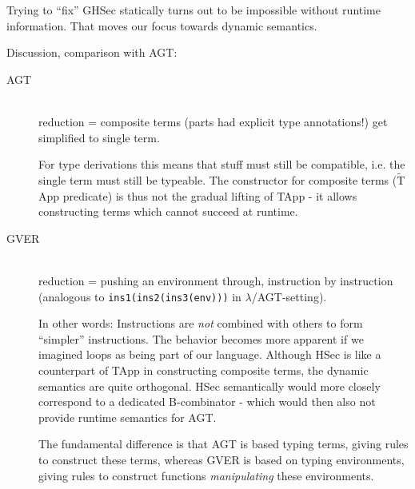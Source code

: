 \documentclass[11pt,a4paper]{article}
\newcommand{\ttt}{\texttt}
\newcommand{\grad}[1]{\widetilde{#1}}
\begin{document}
Trying to “fix” GHSec statically turns out to be impossible without runtime information. That moves our focus towards dynamic semantics. 

Discussion, comparison with AGT:
\begin{description}
	\item [AGT]~\\
	reduction = composite terms (parts had explicit type annotations!) get simplified to single term.
	
	For type derivations this means that stuff must still be compatible, i.e. the single term must still be typeable.
	The constructor for composite terms ($\grad{\text{T}}$App predicate) is thus not the gradual lifting of TApp - it allows constructing terms which cannot succeed at runtime.
	
	\item [GVER]~\\
	reduction = pushing an environment through, instruction by instruction (analogous to \ttt{ins1(ins2(ins3(env)))} in $\lambda$/AGT-setting).
	
	In other words: Instructions are \textit{not} combined with others to form “simpler” instructions.
	The behavior becomes more apparent if we imagined loops as being part of our language.
	Although HSec is like a counterpart of TApp in constructing composite terms, the dynamic semantics are quite orthogonal.
	HSec semantically would more closely correspond to a dedicated B-combinator - which would then also not provide runtime semantics for AGT.
	
	The fundamental difference is that AGT is based typing terms, giving rules to construct these terms, whereas GVER is based on typing environments, giving rules to construct functions \textit{manipulating} these environments.
	

\end{description}
\end{document}
